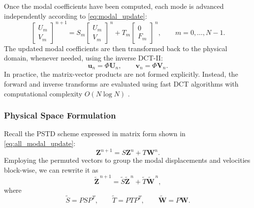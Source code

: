 \documentclass{Configuration_Files/PoliMi3i_thesis}
\newif\ifshowthesischanges
\DeclareRobustCommand{\thesischange}[2]{%
    \ifshowthesischanges
        \textcolor{#1}{#2}%
    \else
        #2%
    \fi
}
\def\thesischange#1#2{#2}%
\begin{document}
Once the modal coefficients have been computed, each mode is advanced independently according to \eqref{eq:modal_update}:
\begin{equation*}
    \begin{bmatrix}
    U_m\\
    V_m
    \end{bmatrix}^{\,n+1}
    =
    S_m
    \begin{bmatrix}
    U_m\\
    V_m
    \end{bmatrix}^{\,n}
    +
    T_m
    \begin{bmatrix}
    0\\
    F_m
    \end{bmatrix}^{\,n},
    \qquad
    m=0,\ldots,N-1.
\end{equation*}
The updated modal coefficients are then transformed back to the physical domain,
whenever needed, using the inverse DCT-II:
\begin{equation*}
\mathbf u_n
=
\Phi\mathbf U_n,
\qquad
\mathbf v_n
=
\Phi\mathbf V_n.
\end{equation*}
In practice, the matrix-vector products are not formed explicitly. Instead, the
\thesischange{blue}{forward and inverse transforms are evaluated using fast DCT algorithms with
computational complexity $O(N\log N)$ \cite{makhoul_fast_1980,rao_discrete_1990,frigo_design_2005}.}

\subsubsection{Physical Space Formulation}
Recall the PSTD scheme expressed in matrix form shown in \eqref{eq:all_modal_update}:
\begin{equation*}
    \mathbf Z^{n+1}
    =
    S\mathbf Z^n
    +
    T\mathbf W^n.
\end{equation*}
Employing the permuted vectors to group the modal displacements and velocities block-wise, we can rewrite it as
\begin{equation*}
\widetilde{\mathbf Z}^{\,n+1}
=
\widetilde S
\widetilde{\mathbf Z}^{\,n}
+
\widetilde T
\widetilde{\mathbf W}^{\,n},
\end{equation*}
where
\begin{equation*}
\widetilde S
=
PSP^T,
\qquad
\widetilde T
=
PTP^T,
\qquad
\widetilde{\mathbf W}
=
P\mathbf W.
\end{equation*}
\end{document}
